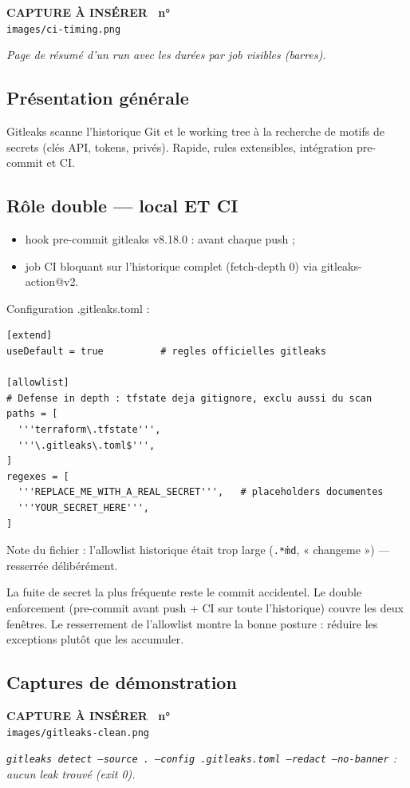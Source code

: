 \documentclass[12pt,a4paper]{article}
\newcounter{capturecount}
\newcommand{\capturebox}[2]{%
\par\vspace{4mm}
\begin{tcolorbox}[enhanced,colback=yellow!5,colframe=black!55,boxrule=0.7pt,
  borderline={0.7pt}{0pt}{black!40,dashed},
  arc=2mm,left=6pt,right=6pt,top=7pt,bottom=7pt]
\centering
{\normalsize\sffamily\bfseries CAPTURE À INSÉRER \textbar\ n°\,\stepcounter{capturecount}\thecapturecount}\\[3pt]
{\large\texttt{images/#2}}\\[7pt]
\begin{minipage}{0.94\linewidth}\centering\itshape #1\end{minipage}
\end{tcolorbox}
\par\vspace{2mm}}
\begin{document}
\capturebox{Page de résumé d'un run avec les durées par job visibles (barres).}{ci-timing.png}


\subsection{Présentation générale}
Gitleaks scanne l'historique Git et le working tree à la recherche de motifs de secrets (clés API, tokens, privés). Rapide, rules extensibles, intégration pre-commit et CI.

\subsection{Rôle double --- local ET CI}
\begin{itemize}[itemsep=1pt]
  \item hook pre-commit gitleaks v8.18.0 : avant chaque push ;
  \item job CI bloquant sur l'historique complet (fetch-depth 0) via gitleaks-action@v2.
\end{itemize}

Configuration .gitleaks.toml :
\begin{lstlisting}[caption={.gitleaks.toml --- structure}]
[extend]
useDefault = true          # regles officielles gitleaks

[allowlist]
# Defense in depth : tfstate deja gitignore, exclu aussi du scan
paths = [
  '''terraform\.tfstate''',
  '''\.gitleaks\.toml$''',
]
regexes = [
  '''REPLACE_ME_WITH_A_REAL_SECRET''',   # placeholders documentes
  '''YOUR_SECRET_HERE''',
]
\end{lstlisting}

Note du fichier : l'allowlist historique était trop large (\texttt{.*\.md}, « changeme ») --- resserrée délibérément.

\begin{whybox}
La fuite de secret la plus fréquente reste le commit accidentel. Le double enforcement (pre-commit avant push + CI sur toute l'historique) couvre les deux fenêtres. Le resserrement de l'allowlist montre la bonne posture : réduire les exceptions plutôt que les accumuler.
\end{whybox}

\subsection{Captures de démonstration}
\capturebox{\texttt{gitleaks detect --source . --config .gitleaks.toml --redact --no-banner} : aucun leak trouvé (exit 0).}{gitleaks-clean.png}
\end{document}
